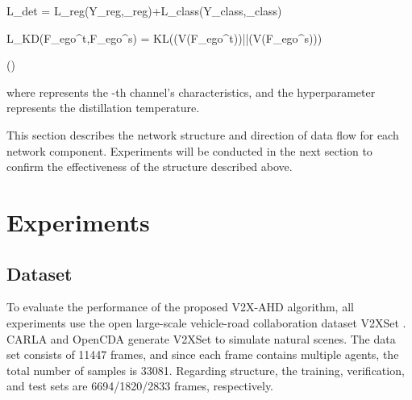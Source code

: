 \documentclass[lettersize,journal]{IEEEtran}
\begin{document}
\label{equation15}
{\mathcal L}_{det} = {\mathcal L}_{reg}(Y_{reg},_{reg})+{\mathcal L}_{class}(Y_{class},_{class})

\label{equation16}
{\mathcal L}_{KD}(F_{ego}^t,F_{ego}^s) = KL(\tau(V(F_{ego}^t))||\tau(V(F_{ego}^s)))

\label{equation17}
\tau(\bullet) \leftarrow {}


where  represents the -th channel's characteristics, and the hyperparameter  represents the distillation temperature.

This section describes the network structure and direction of data flow for each network component. Experiments will be conducted in the next section to confirm the effectiveness of the structure described above.

\section{Experiments}
\subsection{Dataset}
To evaluate the performance of the proposed V2X-AHD algorithm, all experiments use the open large-scale vehicle-road collaboration dataset V2XSet \cite{8} . CARLA \cite{35} and OpenCDA \cite{36} generate V2XSet to simulate natural scenes. The data set consists of 11447 frames, and since each frame contains multiple agents, the total number of samples is 33081. Regarding structure, the training, verification, and test sets are 6694/1820/2833 frames, respectively.
\end{document}
